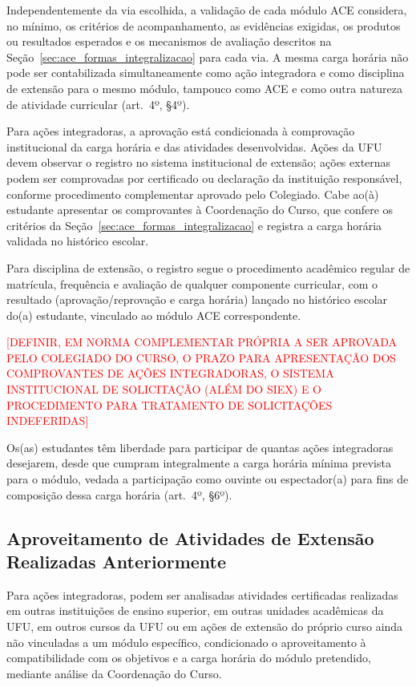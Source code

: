 Independentemente da via escolhida, a validação de cada módulo ACE considera, no mínimo, os critérios de acompanhamento, as evidências exigidas, os produtos ou resultados esperados e os mecanismos de avaliação descritos na Seção~\ref{sec:ace_formas_integralizacao} para cada via. A mesma carga horária não pode ser contabilizada simultaneamente como ação integradora e como disciplina de extensão para o mesmo módulo, tampouco como ACE e como outra natureza de atividade curricular (art.\ 4º, §4º).

Para ações integradoras, a aprovação está condicionada à comprovação institucional da carga horária e das atividades desenvolvidas. Ações da UFU devem observar o registro no sistema institucional de extensão; ações externas podem ser comprovadas por certificado ou declaração da instituição responsável, conforme procedimento complementar aprovado pelo Colegiado. Cabe ao(à) estudante apresentar os comprovantes à Coordenação do Curso, que confere os critérios da Seção~\ref{sec:ace_formas_integralizacao} e registra a carga horária validada no histórico escolar.

Para disciplina de extensão, o registro segue o procedimento acadêmico regular de matrícula, frequência e avaliação de qualquer componente curricular, com o resultado (aprovação/reprovação e carga horária) lançado no histórico escolar do(a) estudante, vinculado ao módulo ACE correspondente.

\textcolor{red}{[DEFINIR, EM NORMA COMPLEMENTAR PRÓPRIA A SER APROVADA PELO COLEGIADO DO CURSO, O PRAZO PARA APRESENTAÇÃO DOS COMPROVANTES DE AÇÕES INTEGRADORAS, O SISTEMA INSTITUCIONAL DE SOLICITAÇÃO (ALÉM DO SIEX) E O PROCEDIMENTO PARA TRATAMENTO DE SOLICITAÇÕES INDEFERIDAS]}

Os(as) estudantes têm liberdade para participar de quantas ações integradoras desejarem, desde que cumpram integralmente a carga horária mínima prevista para o módulo, vedada a participação como ouvinte ou espectador(a) para fins de composição dessa carga horária (art.\ 4º, §6º).

\subsection{Aproveitamento de Atividades de Extensão Realizadas Anteriormente}
\label{sec:ace_aproveitamento}

Para ações integradoras, podem ser analisadas atividades certificadas realizadas em outras instituições de ensino superior, em outras unidades acadêmicas da UFU, em outros cursos da UFU ou em ações de extensão do próprio curso ainda não vinculadas a um módulo específico, condicionado o aproveitamento à compatibilidade com os objetivos e a carga horária do módulo pretendido, mediante análise da Coordenação do Curso.

